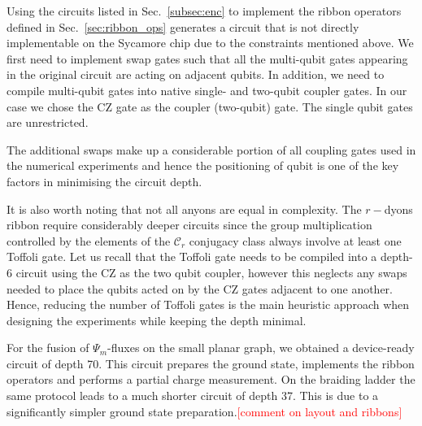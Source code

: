 \documentclass[two column]{article}
\newcommand{\caro}[1]{\textcolor{red}{[#1]}}
\begin{document}
Using the circuits listed in Sec.~\ref{subsec:enc} to implement the ribbon operators defined in Sec.~\ref{sec:ribbon_ops} generates a circuit that is not directly implementable on the Sycamore chip due to the constraints mentioned above. We first need to implement swap gates such that all the multi-qubit gates appearing in the original circuit are acting on adjacent qubits. In addition, we need to compile multi-qubit gates into native single- and two-qubit coupler gates. In our case we chose the CZ gate as the coupler (two-qubit) gate. The single qubit gates are unrestricted.  

The additional swaps make up a considerable portion of all coupling gates used in the numerical experiments and hence the positioning of qubit is one of the key factors in minimising the circuit depth.

It is also worth noting that not all anyons are equal in complexity. The $r-$dyons ribbon require considerably deeper circuits since the group multiplication controlled by the elements of the $\mathcal{C}_r$ conjugacy class always involve at least one Toffoli gate. Let us recall that the Toffoli gate needs to be compiled into a depth-6 circuit using the CZ as the two qubit coupler, however this neglects any swaps needed to place the qubits acted on by the CZ gates adjacent to one another. Hence, reducing the number of Toffoli gates is the main heuristic approach when designing the experiments while keeping the depth minimal.


For the fusion of $\Psi_m$-fluxes on the small planar graph, we obtained a device-ready circuit of depth 70. This circuit prepares the ground state, implements the ribbon operators and performs a partial charge measurement. 
On the braiding ladder the same protocol leads to a much shorter circuit of depth 37. This is due to a significantly simpler ground state preparation.\caro{comment on layout and ribbons}
\end{document}
